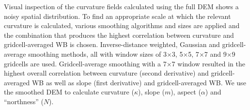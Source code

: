 \documentclass[twocolumn, letterpaper]{igs}
\begin{document}
Visual inspection of the curvature fields calculated using the full DEM shows a noisy spatial distribution. To find an appropriate scale at which the relevant curvature is calculated, various smoothing algorithms and sizes are applied and the combination that produces the highest correlation between curvature and gridcell-averaged WB is chosen. Inverse-distance weighted, Gaussian and gridcell-average smoothing methods, all with window sizes of 3$\times$3, 5$\times$5, 7$\times$7 and 9$\times$9 gridcells are used. Gridcell-average smoothing with a 7$\times$7 window resulted in the highest overall correlation between curvature (second derivative) and gridcell-averaged WB as well as slope (first derivative) and gridcell-averaged WB. We use the smoothed DEM to calculate curvature ($\kappa$), slope ($m$), aspect ($\alpha$) and ``northness'' ($N$).
\end{document}
